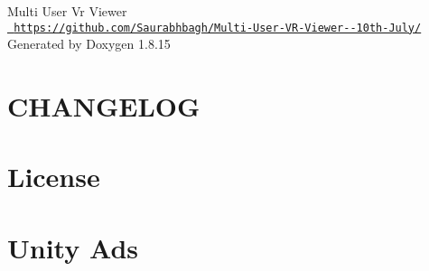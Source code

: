 \let\mypdfximage\pdfximage\def\pdfximage{\immediate\mypdfximage}\documentclass[twoside]{book}
\newcommand{\+}{\discretionary{\mbox{\scriptsize$\hookleftarrow$}}{}{}}
\newcommand{\clearemptydoublepage}{%
  \newpage{\pagestyle{empty}\cleardoublepage}%
}
\begin{document}
\hypersetup{pageanchor=false,
             bookmarksnumbered=true,
             pdfencoding=unicode
            }
\begin{titlepage}
\vspace*{7cm}
\begin{center}%
{\Large Multi User Vr Viewer \\[1ex]\large \href{https://github.com/Saurabhbagh/Multi-User-VR-Viewer--10th-July/}{\texttt{ https\+://github.\+com/\+Saurabhbagh/\+Multi-\/\+User-\/\+V\+R-\/\+Viewer-\/-\/10th-\/\+July/}} }\\
\vspace*{1cm}
{\large Generated by Doxygen 1.8.15}\\
\end{center}
\end{titlepage}
\clearemptydoublepage
{}
\tableofcontents
\clearemptydoublepage
{}
\hypersetup{pageanchor=true}

\chapter{C\+H\+A\+N\+G\+E\+L\+OG}
\label{md__o_1__git_h_u_b_m_i_n_i_p_roject__library__package_cache_com_8unity_8ads_0D2_80_88__c_h_a_n_g_e_l_o_g}

\chapter{License}
\label{md__o_1__git_h_u_b_m_i_n_i_p_roject__library__package_cache_com_8unity_8ads_0D2_80_88__license}

\chapter{Unity Ads}
\label{md__o_1__git_h_u_b_m_i_n_i_p_roject__library__package_cache_com_8unity_8ads_0D2_80_88__r_e_a_d_m_e}

\end{document}
